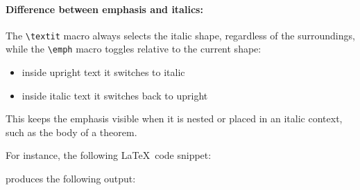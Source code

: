 		\paragraph*{Difference between emphasis and italics:}
		The \verb|\textit| macro always selects the italic shape, regardless of the surroundings, while the \verb|\emph| macro toggles relative to the current shape:
		\begin{itemize}
			\item inside upright text it switches to italic
			\item inside italic text it switches back to upright
		\end{itemize}
		This keeps the emphasis visible when it is nested or placed in an italic context, such as the body of a theorem.
		
		For instance, the following \LaTeX\ code snippet:

		produces the following output:
